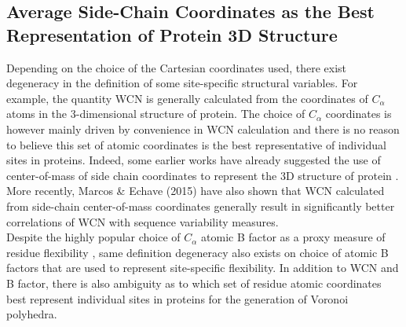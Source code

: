 \documentclass[11pt]{article}
\begin{document}
\begin{appendices}

\section{Average Side-Chain Coordinates as the Best Representation of Protein 3D Structure}
\label{app:best_crd}

    Depending on the choice of the Cartesian coordinates used, there exist degeneracy in the definition of some site-specific structural variables. For example, the quantity WCN is generally calculated from the coordinates of $C_\alpha$ atoms in the 3-dimensional structure of protein. The choice of $C_\alpha$ coordinates is however mainly driven by convenience in WCN calculation and there is no reason to believe this set of atomic coordinates is the best representative of individual sites in proteins. Indeed, some earlier works have already suggested the use of center-of-mass of side chain coordinates to represent the 3D structure of protein \cite{soyer_voronoi_2000}. More recently, Marcos \& Echave (2015) \cite{marcos_too_2015} have also shown that WCN calculated from side-chain center-of-mass coordinates generally result in significantly better correlations of WCN with sequence variability measures. \\

    Despite the highly popular choice of $C_\alpha$ atomic B factor as a proxy measure of residue flexibility \cite{halle_flexibility_2002}, same definition degeneracy also exists on choice of atomic B factors that are used to represent site-specific flexibility. In addition to WCN and B factor, there is also ambiguity as to which set of residue atomic coordinates best represent individual sites in proteins for the generation of Voronoi polyhedra. \\


\end{appendices}
\end{document}
